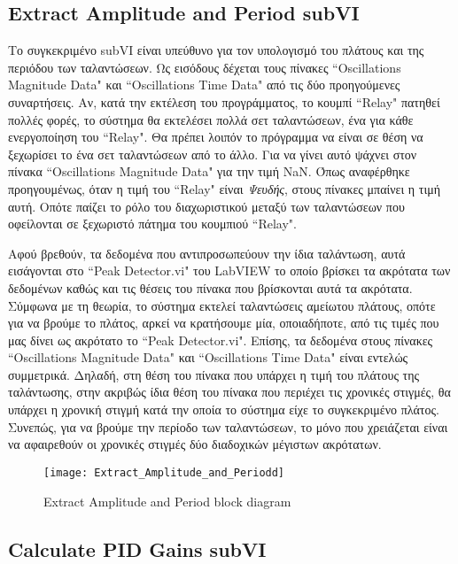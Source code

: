 \subsection{Extract Amplitude and Period subVI}

Το συγκεκριμένο subVI είναι υπεύθυνο για τον υπολογισμό του πλάτους και της περιόδου των ταλαντώσεων. Ως εισόδους δέχεται τους πίνακες ``Oscillations Magnitude Data" και ``Oscillations Time Data" από τις δύο προηγούμενες συναρτήσεις. Αν, κατά την εκτέλεση του προγράμματος, το κουμπί ``Relay" πατηθεί πολλές φορές, το σύστημα θα εκτελέσει πολλά σετ ταλαντώσεων, ένα για κάθε ενεργοποίηση του ``Relay". Θα πρέπει λοιπόν το πρόγραμμα να είναι σε θέση να ξεχωρίσει το ένα σετ ταλαντώσεων από το άλλο. Για να γίνει αυτό ψάχνει στον πίνακα ``Oscillations Magnitude Data" για την τιμή NaN. Όπως αναφέρθηκε προηγουμένως, όταν η τιμή του ``Relay" είναι \textit{Ψευδής}, στους πίνακες μπαίνει η τιμή αυτή. Οπότε παίζει το ρόλο του διαχωριστικού μεταξύ των ταλαντώσεων που οφείλονται σε ξεχωριστό πάτημα του κουμπιού ``Relay".

Αφού βρεθούν, τα δεδομένα που αντιπροσωπεύουν την ίδια ταλάντωση, αυτά εισάγονται στο ``Peak Detector.vi" του LabVIEW το οποίο βρίσκει τα ακρότατα των δεδομένων καθώς και τις θέσεις του πίνακα που βρίσκονται αυτά τα ακρότατα. Σύμφωνα με τη θεωρία, το σύστημα εκτελεί ταλαντώσεις αμείωτου πλάτους, οπότε για να βρούμε το πλάτος, αρκεί να κρατήσουμε μία, οποιαδήποτε, από τις τιμές που μας δίνει ως ακρότατο το ``Peak Detector.vi". Επίσης, τα δεδομένα  στους πίνακες ``Oscillations Magnitude Data" και ``Oscillations Time Data" είναι εντελώς συμμετρικά. Δηλαδή, στη θέση του πίνακα που υπάρχει η τιμή του πλάτους της ταλάντωσης, στην ακριβώς ίδια θέση του πίνακα που περιέχει τις χρονικές στιγμές, θα υπάρχει η χρονική στιγμή κατά την οποία το σύστημα είχε το συγκεκριμένο πλάτος. Συνεπώς, για να βρούμε την περίοδο των ταλαντώσεων, το μόνο που χρειάζεται είναι να αφαιρεθούν οι χρονικές στιγμές δύο διαδοχικών μέγιστων ακρότατων.

\begin{figure}[h]
  \centering
  \texttt{[image: Extract\_Amplitude\_and\_Periodd]}
  \caption{Extract Amplitude and Period block diagram}
  \label{fig:Extract_Amplitude_and_Periodd}
\end{figure}

\subsection{Calculate PID Gains subVI}

